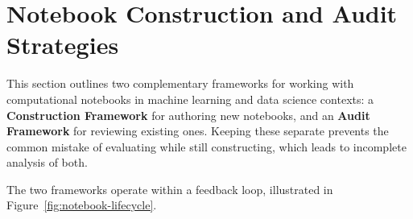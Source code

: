 \documentclass[11pt, a4paper]{article}
\begin{document}
\section*{Notebook Construction and Audit Strategies}

This section outlines two complementary frameworks for working with
computational notebooks in machine learning and data science contexts:
a \textbf{Construction Framework} for authoring new notebooks, and an
\textbf{Audit Framework} for reviewing existing ones. Keeping these
separate prevents the common mistake of evaluating while still
constructing, which leads to incomplete analysis of both.

The two frameworks operate within a feedback loop, illustrated in
Figure~\ref{fig:notebook-lifecycle}.

\end{document}
